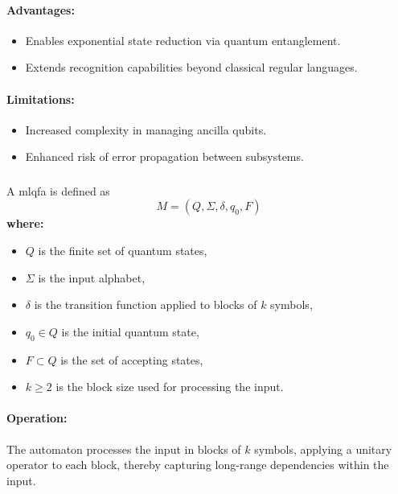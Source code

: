 \paragraph{Advantages:}
\begin{itemize}
    \item Enables exponential state reduction via quantum entanglement.
    \item Extends recognition capabilities beyond classical regular languages.
\end{itemize}

\paragraph{Limitations:}
\begin{itemize}
    \item Increased complexity in managing ancilla qubits.
    \item Enhanced risk of error propagation between subsystems.
\end{itemize}

\subsubsection{}
\label{subsec:ml-qfa}
\begin{definition}
A \gls{mlqfa} is defined as 
\[
M = (Q, \Sigma, \delta, q_0, F)
\]
\textbf{where:}
\begin{itemize}
    \item \( Q \) is the finite set of quantum states,
    \item \( \Sigma \) is the input alphabet,
    \item \( \delta \) is the transition function applied to blocks of \( k \) symbols,
    \item \( q_0 \in Q \) is the initial quantum state,
    \item \( F \subset Q \) is the set of accepting states,
    \item \( k \geq 2 \) is the block size used for processing the input.
\end{itemize}
\end{definition}

\paragraph{Operation:}  
The automaton processes the input in blocks of \( k \) symbols, applying a unitary operator to each block, thereby capturing long-range dependencies within the input.


